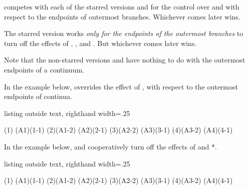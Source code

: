 \cmd{\xtShowEndPoints*} competes with each of the starred versions \cmd{\cntmistb*} and \cmd{\cntmAistb*} for the control over \cmd{\cntmistb} and \cmd{\cntmAistb} with respect to the endpoints of outermost branches.
Whichever comes later wins.

The starred version \cmd{\xtHideEndPoints*} works \emph{only for the endpoints of the outermost branches} to turn off the effects of \cmd{\xtShowEndPoints(*)}, \cmd{\cntmistb*}, and \cmd{\cntmAistb*}. But whichever comes later wins.

Note that the non-starred versions \cmd{\xtShowEndPoints} and \cmd{\xtHideEndPoints} have nothing to do with the outermost endpoints of a continuum.

In the example below, \cmd{\cntmistb*} overrides the effect of , with respect to the outermost endpoints of continua.

\begin{tcblisting}{listing outside text, righthand width=.25\linewidth}
\begin{istgame}
\cntmdistance*{8mm}{16mm}
\cntmpreset*
{}
\cntmistb
\istrootcntm(1)           \istb  \endist
\istroot(A1)(1-1)  \istb  \istb  \endist
\cntmistb
\istrootcntm(2)(A1-2)     \istb  \endist
\istroot(A2)(2-1)  \istb  \istb  \endist
\cntmistb*
\istrootcntm(3)(A2-2)     \istb  \endist
\istroot(A3)(3-1)  \istb  \istb  \endist
\cntmistb
\istrootcntm(4)(A3-2)     \istb  \endist
\istroot(A4)(4-1)  \istb  \istb  \endist
\end{istgame}
\end{tcblisting}


In the example below, \cmd{\xtHideEndPoints} and \cmd{\xtHidePoints*} cooperatively turn off the effects of \cmd{\xtShowEndPoints*} and \cmd{\cntmAistb}*.

\begin{tcblisting}{listing outside text, righthand width=.25\linewidth}
\begin{istgame}
\cntmdistance*{8mm}{16mm}
\cntmAistb*
\istrootcntmA(1)          \istbA \endist
\istroot(A1)(1-1)  \istb  \istb  \endist
{}
\cntmAistb
\istrootcntmA(2)(A1-2)    \istbA \endist
\istroot(A2)(2-1)  \istb  \istb  \endist
\cntmAistb
\istrootcntmA(3)(A2-2)    \istbA \endist
\istroot(A3)(3-1)  \istb  \istb  \endist
\cntmAistb*
\xtHideEndPoints* %
\xtHideEndPoints
\istrootcntmA(4)(A3-2)    \istbA \endist
\istroot(A4)(4-1)  \istb  \istb  \endist
\end{istgame}
\end{tcblisting}


